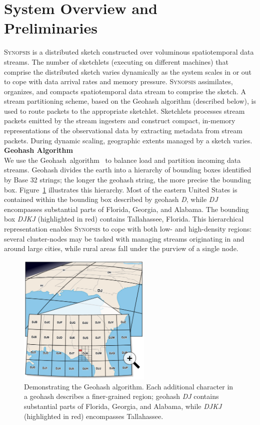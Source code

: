 \section{System Overview and Preliminaries}
\label{sec:system}
\textsc{Synopsis} is a distributed sketch constructed over voluminous spatiotemporal data streams.
The number of sketchlets (executing on different machines) that comprise the distributed sketch varies dynamically as the system scales in or out to cope with data arrival rates and memory pressure.
\textsc{Synopsis} assimilates, organizes, and compacts spatiotemporal data stream to comprise the sketch.
A stream partitioning scheme, based on the Geohash algorithm (described below), is used to route packets to the appropriate sketchlet.
Sketchlets processes stream packets emitted by the stream ingesters and construct compact, in-memory representations of the observational data by extracting metadata from stream packets.
During dynamic scaling, geographic extents managed by a sketch varies.
\vspace{1em} \\
\textbf{Geohash Algorithm} \\
We use the Geohash~algorithm~\cite{geohash} to balance load and partition incoming data streams. Geohash divides the earth into a hierarchy of bounding boxes identified by Base 32 strings; the longer the geohash string, the more precise the bounding box. Figure~\ref{fig:geohash} illustrates this hierarchy. Most of the eastern United States is contained within the bounding box described by geohash \emph{D}, while \emph{DJ} encompasses substantial parts of Florida, Georgia, and Alabama. The bounding box \emph{DJKJ} (highlighted in red) contains Tallahassee, Florida. This hierarchical representation enables \textsc{Synopsis} to cope with both low- and high-density regions: several cluster-nodes may be tasked with managing streams originating in and around large cities, while rural areas fall under the purview of a single node.

\begin{figure}[b!]
    \centerline{\includegraphics[width=2.5in]{figures/geohash.pdf}}
    \caption{Demonstrating the Geohash algorithm. Each additional character in a geohash describes a finer-grained region; geohash \emph{DJ} contains substantial parts of Florida, Georgia, and Alabama, while \emph{DJKJ} (highlighted in red) encompasses Tallahassee.}
    \label{fig:geohash}
\end{figure}

